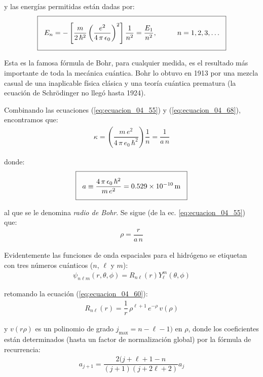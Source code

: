 y las energías permitidas están dadas por:
\begin{align}
\setlength{\fboxsep}{3\fboxsep}\boxed{
E_{n} = - \left[ \dfrac{m}{2 \, \hbar^{2}} \left( \dfrac{e^{2}}{4 \, \pi \, \epsilon_{0}} \right)^{2} \right] \dfrac{1}{n^{2}} = \dfrac{E_{1}}{n^{2}}, \hspace{1cm} n = 1, 2, 3, \ldots}
\label{eq:ecuacion_04_70}
\end{align}

Esta es la famosa fórmula de Bohr, para cualquier medida, es el resultado más importante de toda la mecánica cuántica. Bohr lo obtuvo en 1913 por una mezcla casual de una inaplicable física clásica y una teoría cuántica prematura (la ecuación de Schrödinger no llegó hasta 1924).
\par
Combinando las ecuaciones (\ref{eq:ecuacion_04_55}) y (\ref{eq:ecuacion_04_68}), encontramos que:
\begin{align}
\kappa = \left( \dfrac{m \, e^{2}}{4 \, \pi \, e_{0} \, \hbar^{2}} \right) \dfrac{1}{n} = \dfrac{1}{a \, n}
\label{eq:ecuacion_04_71}
\end{align}

donde:
\begin{align}
\setlength{\fboxsep}{3\fboxsep}\boxed{
a \equiv \dfrac{4 \, \pi \, \epsilon_{0} \, \hbar^{2}}{m \, e^{2}} = \SI{0.529e-10}{\metre}}
\label{eq:ecuacion_04_72}
\end{align}

al que se le denomina \emph{radio de Bohr}. Se sigue (de la ec. \ref{eq:ecuacion_04_55}) que:
\begin{align}
\rho = \dfrac{r}{a \, n}
\label{eq:ecuacion_04_73}
\end{align}

Evidentemente las funciones de onda espaciales para el hidrógeno se etiquetan con tres números cuánticos ($n$, $\ell$ y $m$):
\begin{align}
\psi_{n \ell m} (r, \theta, \phi) =  R_{n \ell} (r) Y_{\ell}^{m} (\theta, \phi)
\label{eq:ecuacion_04_74}
\end{align}

retomando la ecuación (\ref{eq:ecuacion_04_60}):
\begin{align}
R_{n \ell}(r) = \dfrac{1}{r} \, \rho^{\ell + 1} \, e^{-\rho} \, v(\rho)
\label{eq:ecuacion_04_75}
\end{align}

y $v(r\rho)$ es un polinomio de grado $j_{\text{max}} = n - \ell - 1)$ en $\rho$, donde los coeficientes están determinados (hasta un factor de normalización global) por la fórmula de recurrencia:
\begin{align}
a_{j+1} = \dfrac{2 (j + \ell + 1 - n}{(j + 1)(j + 2 \ell + 2)} a_{j}
\label{eq:ecuacion_04_76}
\end{align}

